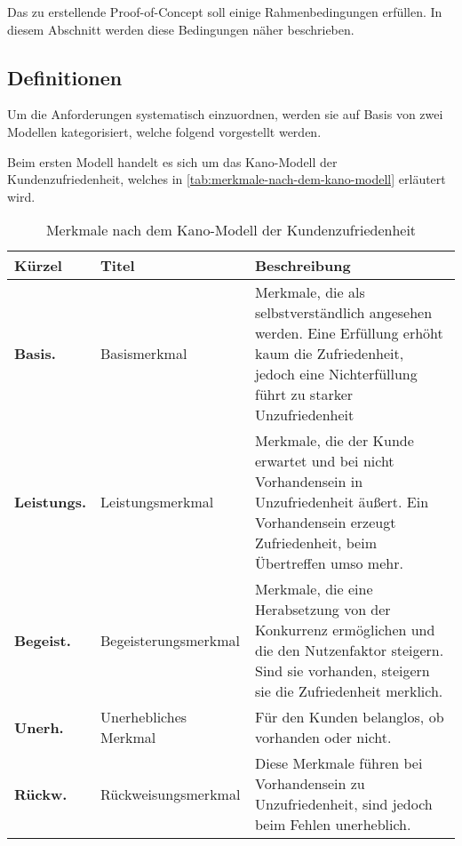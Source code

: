 
Das zu erstellende Proof-of-Concept soll einige Rahmenbedingungen erfüllen. In diesem Abschnitt werden diese Bedingungen näher beschrieben.
	
\subsection{Definitionen}
	
Um die Anforderungen systematisch einzuordnen, werden sie auf Basis von zwei Modellen kategorisiert, welche folgend vorgestellt werden.

Beim ersten Modell handelt es sich um das Kano-Modell \cite{KanoModell} der Kundenzufriedenheit, welches in  \autoref{tab:merkmale-nach-dem-kano-modell} erläutert wird.

\begin{table}[H]
\begin{tabular}{ |p{1.75cm}|p{2.40cm}|p{9.25cm}| }
	\hline
	Kürzel & Titel & Beschreibung \\
	\hline
	\textbf{Basis.} & Basis\-merkmal & Merkmale, die als selbstverständlich angesehen werden. Eine Erfüllung erhöht kaum die Zufriedenheit, jedoch eine Nichterfüllung führt zu starker Unzufriedenheit \\
	\hline
	\textbf{Leistungs.} & Leistungs\-merkmal & Merkmale, die der Kunde erwartet und bei nicht Vorhandensein in Unzufriedenheit äußert. Ein Vorhandensein erzeugt Zufriedenheit, beim Übertreffen umso mehr. \\
	\hline
	\textbf{Begeist.} & Begeisterungs\-merkmal & Merkmale, die eine Herabsetzung von der Konkurrenz ermöglichen und die den Nutzenfaktor steigern. Sind sie vorhanden, steigern sie die Zufriedenheit merklich. \\
	\hline
	\textbf{Unerh.} & Unerhebliches Merkmal & Für den Kunden belanglos, ob vorhanden oder nicht. \\
	\hline
	\textbf{Rückw.} & Rückweisungs\-merkmal & Diese Merkmale führen bei Vorhandensein zu Unzufriedenheit, sind jedoch beim Fehlen unerheblich. \\
	\hline
\end{tabular}
 \captionsetup{justification=centering}
  \caption{Merkmale nach dem Kano-Modell der Kundenzufriedenheit}
   \label{tab:merkmale-nach-dem-kano-modell}
\end{table}

